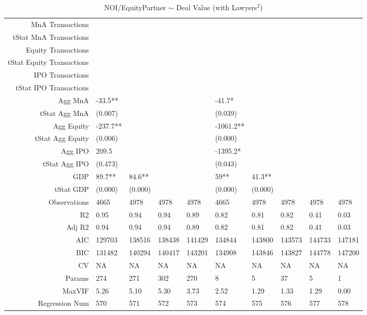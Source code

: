 \begin{table}[ht]
\begin{tabular}{rlllllllll}
  MnA Transactions &  &  &  &  &  &  &  &  &  \\ 
  tStat MnA Transactions &  &  &  &  &  &  &  &  &  \\ 
  Equity Transactions &  &  &  &  &  &  &  &  &  \\ 
  tStat Equity Transactions &  &  &  &  &  &  &  &  &  \\ 
  IPO Transactions &  &  &  &  &  &  &  &  &  \\ 
  tStat IPO Transactions &  &  &  &  &  &  &  &  &  \\ 
  Agg MnA & -33.5** &  &  &  & -41.7* &  &  &  &  \\ 
  tStat Agg MnA & (0.007) &  &  &  & (0.039) &  &  &  &  \\ 
  Agg Equity & -237.7** &  &  &  & -1061.2** &  &  &  &  \\ 
  tStat Agg Equity & (0.006) &  &  &  & (0.000) &  &  &  &  \\ 
  Agg IPO & 209.5 &  &  &  & -1395.2* &  &  &  &  \\ 
  tStat Agg IPO & (0.473) &  &  &  & (0.043) &  &  &  &  \\ 
  GDP & 89.7** & 84.6** &  &  & 59** & 41.3** &  &  &  \\ 
  tStat GDP & (0.000) & (0.000) &  &  & (0.000) & (0.000) &  &  &  \\ 
  Observations & 4665 & 4978 & 4978 & 4978 & 4665 & 4978 & 4978 & 4978 & 4978 \\ 
  R2 & 0.95 & 0.94 & 0.94 & 0.89 & 0.82 & 0.81 & 0.82 & 0.41 & 0.03 \\ 
  Adj R2 & 0.94 & 0.94 & 0.94 & 0.89 & 0.82 & 0.81 & 0.82 & 0.41 & 0.03 \\ 
  AIC & 129703 & 138516 & 138438 & 141429 & 134844 & 143800 & 143573 & 144733 & 147181 \\ 
  BIC & 131482 & 140294 & 140417 & 143201 & 134908 & 143846 & 143827 & 144778 & 147200 \\ 
  CV & NA & NA & NA & NA & NA & NA & NA & NA & NA \\ 
  Params & 274 & 271 & 302 & 270 & 8 & 5 & 37 & 5 & 1 \\ 
  MaxVIF & 5.26 & 5.10 & 5.30 & 3.73 & 2.52 & 1.29 & 1.33 & 1.29 & 0.00 \\ 
  Regression Num & 570 & 571 & 572 & 573 & 574 & 575 & 576 & 577 & 578 \\ 
   \hline
\end{tabular}
\caption{NOI/EquityPartner $\sim$ Deal Value (with Lawyers$^2$)} 
\end{table}
